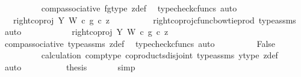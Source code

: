 \begin{isabellebody}
\ \ \ \ \ \ \ \ \isamarkupfalse%
\ comp{\isacharunderscore}{\kern0pt}associative{}\ fg{\isacharunderscore}{\kern0pt}type\ z{\isacharunderscore}{\kern0pt}def\ \isamarkupfalse%
\ {\isacharparenleft}{\kern0pt}typecheck{\isacharunderscore}{\kern0pt}cfuncs{\isacharcomma}{\kern0pt}\ auto{\isacharparenright}{\kern0pt}\isanewline
\ \ \ \ \ \ \isamarkupfalse%
\ \isamarkupfalse%
\ {\isachardoublequoteopen}{\isachardot}{\kern0pt}{\isachardot}{\kern0pt}{\isachardot}{\kern0pt}\ {\isacharequal}{\kern0pt}\ {\isacharparenleft}{\kern0pt}right{\isacharunderscore}{\kern0pt}coproj\ Y\ W\ {\isasymcirc}\isactrlsub c\ g{\isacharparenright}{\kern0pt}\ {\isasymcirc}\isactrlsub c\ z{\isachardoublequoteclose}\isanewline
\ \ \ \ \ \ \ \ \isamarkupfalse%
\ right{\isacharunderscore}{\kern0pt}coproj{\isacharunderscore}{\kern0pt}cfunc{\isacharunderscore}{\kern0pt}bowtie{\isacharunderscore}{\kern0pt}prod\ type{\isacharunderscore}{\kern0pt}assms\ \isamarkupfalse%
\ auto\isanewline
\ \ \ \ \ \ \isamarkupfalse%
\ \isamarkupfalse%
\ {\isachardoublequoteopen}{\isachardot}{\kern0pt}{\isachardot}{\kern0pt}{\isachardot}{\kern0pt}\ {\isacharequal}{\kern0pt}\ right{\isacharunderscore}{\kern0pt}coproj\ Y\ W\ {\isasymcirc}\isactrlsub c\ g\ {\isasymcirc}\isactrlsub c\ z{\isachardoublequoteclose}\isanewline
\ \ \ \ \ \ \ \ \isamarkupfalse%
\ comp{\isacharunderscore}{\kern0pt}associative{}\ type{\isacharunderscore}{\kern0pt}assms{\isacharparenleft}{\kern0pt}{}{\isacharparenright}{\kern0pt}\ z{\isacharunderscore}{\kern0pt}def\ \isamarkupfalse%
\ {\isacharparenleft}{\kern0pt}typecheck{\isacharunderscore}{\kern0pt}cfuncs{\isacharcomma}{\kern0pt}\ auto{\isacharparenright}{\kern0pt}\isanewline
\ \ \ \ \ \ \isamarkupfalse%
\ \isamarkupfalse%
\ False\isanewline
\ \ \ \ \ \ \ \ \isamarkupfalse%
\ calculation\ comp{\isacharunderscore}{\kern0pt}type\ coproducts{\isacharunderscore}{\kern0pt}disjoint\ type{\isacharunderscore}{\kern0pt}assms{\isacharparenleft}{\kern0pt}{}{\isacharparenright}{\kern0pt}\ y{\isacharunderscore}{\kern0pt}type{}\ z{\isacharunderscore}{\kern0pt}def\ \isamarkupfalse%
\ auto\isanewline
\ \ \ \isamarkupfalse%
\isanewline
\ \ \ \isamarkupfalse%
\ \isamarkupfalse%
\ {\isacharquery}{\kern0pt}thesis\isanewline
\ \ \ \ \ \isamarkupfalse%
\ simp\isanewline

\end{isabellebody}
